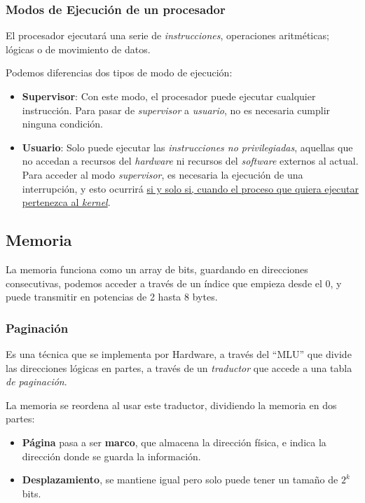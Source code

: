 \subsubsection{Modos de Ejecución de un procesador}
El procesador ejecutará una serie de \textit{instrucciones}, operaciones aritméticas; lógicas o de movimiento de datos.
\par \vspace{.2cm}  Podemos diferencias dos tipos de modo de ejecución:
\begin{itemize}
        \item \textbf{Supervisor}: Con este modo, el procesador puede ejecutar cualquier instrucción. Para pasar de \textit{supervisor} a \textit{usuario}, no es necesaria cumplir ninguna condición.
        \item \textbf{Usuario}: Solo puede ejecutar las \textit{instrucciones no privilegiadas}, aquellas que no accedan a recursos del \textit{hardware} ni recursos del \textit{software} externos al actual. Para acceder al modo \textit{supervisor}, es necesaria la ejecución de una interrupción, y esto ocurrirá \underline{si y solo si, cuando el proceso que quiera ejecutar pertenezca al \textit{kernel}}.
\end{itemize}
\subsection{Memoria}
La memoria funciona como un array de bits, guardando en direcciones consecutivas, podemos acceder a través de un índice que empieza desde el 0, y puede transmitir en potencias de 2 hasta 8 bytes.
\subsubsection{Paginación}
Es una técnica que se implementa por Hardware, a través del ``MLU'' que divide las direcciones lógicas en partes, a través de un \textit{traductor} que accede a una tabla \textit{de paginación}.
\par \vspace{.2cm} La memoria se reordena al usar este traductor, dividiendo la memoria en dos partes:
\begin{itemize}
        \item \textbf{Página} pasa a ser \textbf{marco}, que almacena la dirección física, e indica la dirección donde se guarda la información.
        \item \textbf{Desplazamiento}, se mantiene igual pero solo puede tener un tamaño de \(2^k\)bits.
\end{itemize}
